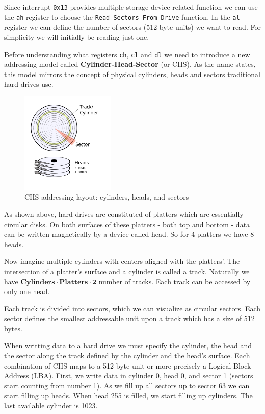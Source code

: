 Since interrupt \texttt{0x13} provides multiple storage device related function we can use the \texttt{ah} register
to choose the \texttt{Read Sectors From Drive} function.
In the \texttt{al} register we can define the number of sectors (512-byte units) we want to read. For simplicity
we will initially be reading just one.

Before understanding what registers \texttt{ch}, \texttt{cl} and \texttt{dl} we need to introduce a new addressing
model called \textbf{Cylinder-Head-Sector} (or CHS). As the name states, this model mirrors the concept of physical 
cylinders, heads and sectors traditional hard drives use. 

\begin{figure}[H]
    \centering
    \includegraphics[width=0.4\textwidth]{images/chs_diagram.png}
    \caption{CHS addressing layout: cylinders, heads, and sectors}
    \label{fig:chs}
\end{figure}

As shown above, hard drives are constituted of platters which are essentially circular disks. On both surfaces
of these platters - both top and bottom - data can be written magnetically by a device called head. So for 
4 platters we have 8 heads. 

Now imagine multiple cylinders with centers aligned with the platters'. The intersection of a platter's surface 
and a cylinder is called a track. Naturally we have \(\textbf{Cylinders} \cdot \textbf{Platters} \cdot \textbf{2}\)
number of tracks. Each track can be accessed by only one head.

Each track is divided into sectors, which we can visualize as circular sectors. Each sector defines the smallest addressable
unit upon a track which has a size of 512 bytes.

When writting data to a hard drive we must specify the cylinder, the head and the sector along the track defined by the
cylinder and the head's surface. Each combination of CHS maps to a 512-byte unit or more precisely a Logical Block 
Address (LBA). First, we write data in cylinder 0, head 0, and sector 1 (sectors start counting from number 1). As we 
fill up all sectors up to sector 63 we can start filling up heads. When head 255 is filled, we start filling up cylinders. The 
last available cylinder is 1023. 


